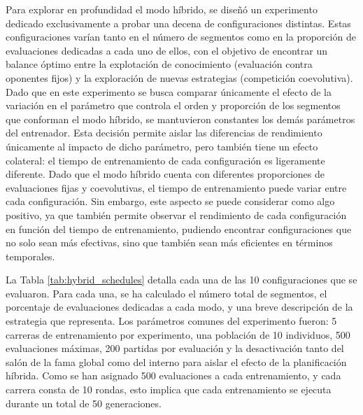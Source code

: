 Para explorar en profundidad el modo híbrido, se diseñó un experimento dedicado exclusivamente a probar una decena de configuraciones distintas. Estas configuraciones varían tanto en el número de segmentos como en la proporción de evaluaciones dedicadas a cada uno de ellos, con el objetivo de encontrar un balance óptimo entre la explotación de conocimiento (evaluación contra oponentes fijos) y la exploración de nuevas estrategias (competición coevolutiva). Dado que en este experimento se busca comparar únicamente el efecto de la variación en el parámetro que controla el orden y proporción de los segmentos que conforman el modo híbrido, se mantuvieron constantes los demás parámetros del entrenador. Esta decisión permite aislar las diferencias de rendimiento únicamente al impacto de dicho parámetro, pero también tiene un efecto colateral: el tiempo de entrenamiento de cada configuración es ligeramente diferente. Dado que el modo híbrido cuenta con diferentes proporciones de evaluaciones fijas y coevolutivas, el tiempo de entrenamiento puede variar entre cada configuración. Sin embargo, este aspecto se puede considerar como algo positivo, ya que también permite observar el rendimiento de cada configuración en función del tiempo de entrenamiento, pudiendo encontrar configuraciones que no solo sean más efectivas, sino que también sean más eficientes en términos temporales.

La Tabla \ref{tab:hybrid_schedules} detalla cada una de las 10 configuraciones que se evaluaron. Para cada una, se ha calculado el número total de segmentos, el porcentaje de evaluaciones dedicadas a cada modo, y una breve descripción de la estrategia que representa. Los parámetros comunes del experimento fueron: 5 carreras de entrenamiento por experimento, una población de 10 individuos, 500 evaluaciones máximas, 200 partidas por evaluación y la desactivación tanto del salón de la fama global como del interno para aislar el efecto de la planificación híbrida. Como se han asignado 500 evaluaciones a cada entrenamiento, y cada carrera consta de 10 rondas, esto implica que cada entrenamiento se ejecuta durante un total de 50 generaciones.

